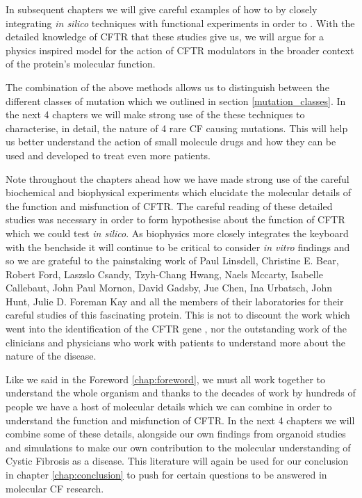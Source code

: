In subsequent chapters we will give careful examples of how to by closely integrating \textit{in silico} techniques with functional experiments in order to . With the detailed knowledge of CFTR that these studies give us, we will argue for a physics inspired model for the action of CFTR modulators in the broader context of the protein's molecular function. 

The combination of the above methods allows us to distinguish between the different classes of mutation which we outlined in section \ref{mutation_classes}. In the next 4 chapters we will make strong use of the these techniques to characterise, in detail, the nature of 4 rare CF causing mutations. This will help us better understand the action of small molecule drugs and how they can be used and developed to treat even more patients.

Note throughout the chapters ahead how we have made strong use of the careful biochemical and biophysical experiments which elucidate the molecular details of the function and misfunction of CFTR. The careful reading of these detailed studies was necessary in order to form hypothesise about the function of CFTR which we could test \textit {in silico}. As biophysics more closely integrates the keyboard with the benchside it will continue to be critical to consider \textit{in vitro} findings and so we are grateful to the painstaking work of Paul Linsdell, Christine E. Bear, Robert Ford, Laszslo Csandy, Tzyh-Chang Hwang, Naels Mccarty, Isabelle Callebaut, John Paul Mornon, David Gadsby, Jue Chen, Ina Urbatsch, John Hunt, Julie D. Foreman Kay and all the members of their laboratories for their careful studies of this fascinating protein. This is not to discount the work which went into the identification of the CFTR gene \cite{riordan1989}, nor the outstanding work of the clinicians and physicians who work with patients to understand more about the nature of the disease.  

Like we said in the Foreword \ref{chap:foreword}, we must all work together to understand the whole organism and thanks to the decades of work by hundreds of people we have a host of molecular details which we can combine in order to understand the function and misfunction of CFTR. In the next 4 chapters we will combine some of these details, alongside our own findings from organoid studies and simulations to make our own contribution to the molecular understanding of Cystic Fibrosis as a disease. This literature will again be used for our conclusion in chapter \ref{chap:conclusion} to push for certain questions to be answered in molecular CF research.
